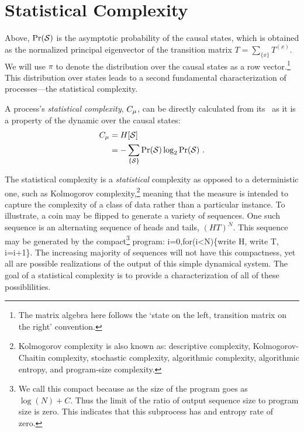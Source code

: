 \section{Statistical Complexity}
Above, $\Pr(\mathcal{S})$ is the asymptotic probability of the causal states, which is obtained as the normalized principal eigenvector
of the transition matrix $T = \sum_{\{x\}} T^{(x)}$.  We will use $\pi$ 
to denote the distribution over the causal states as a row vector.\footnote{The matrix algebra here follows the `state on the left, transition matrix on the right' convention.} 
This distribution over states leads to a second fundamental characterization of processes---the statistical complexity.
\begin{Def}
A process's \emph{statistical complexity}, $C_\mu$, can be directly calculated
from its \eM\ as it is a property of the dynamic over the causal states:
\begin{align}
C_\mu
   & = H[\mathcal{S}] \nonumber \\
   & = - \sum_{\{\mathcal{S}\}} \Pr(\mathcal{S}) \log_2 \Pr(\mathcal{S}) ~.
\end{align}
\end{Def}
The statistical complexity is a \emph{statistical} complexity as opposed to a deterministic one, such as Kolmogorov complexity,\footnote{Kolmogorov complexity is also known as: descriptive complexity, Kolmogorov-Chaitin complexity, stochastic complexity, algorithmic complexity, algorithmic entropy, and program-size complexity.} meaning that the measure is intended to capture the complexity of a class of data rather than a particular instance. To illustrate, a coin may be flipped to generate a variety of sequences. One such sequence is an alternating sequence of heads and tails, $(HT)^N$. This sequence may be generated by the compact\footnote{We call this compact because as the size of the program goes as $\log(N) + C$. Thus the limit of the ratio of output sequence size to program size is zero. This indicates that this subprocess has and entropy rate of zero.} program: i=0,for(i<N)\{write H, write T, i=i+1\}. The increasing majority of sequences will not have this compactness, yet all are possible realizations of the output of this simple dynamical system. The goal of a statistical complexity is to provide a characterization of all of these possiblilities.

